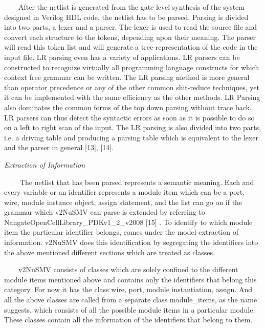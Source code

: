 \documentclass[a4paper]{article}
\begin{document}
{\color[rgb]{0.0,0.0,0.039215688}
\textrm{\ \ }\textrm{\ \ After the netlist is generated from the gate
level synthesis of the system designed in Verilog HDL code, the netlist
has to be parsed. Parsing is divided into two parts, a lexer and a
parser. The lexer is used to read the source file and convert each
structure to the tokens, depending upon their meaning. The parser will
read this token list and will generate a tree-representation of the
code in the input file. LR parsing even has a variety of applications.
LR parsers can be constructed to recognize virtually all programming
language constructs for which context free grammar can be written. The
LR parsing method is more general than operator precedence or any of
the other common shit-reduce techniques, yet it can be implemented with
the same efficiency as the other methods. LR Parsing also dominates the
common forms of the top down parsing without trace back. LR parsers can
thus detect the syntactic errors as soon as it is possible to do so on
a left to right scan of the input. The LR parsing is also divided into
two parts, i.e. a driving table and producing a parsing table which is
equivalent to the lexer and the parser in general [13], [14].\ }}

{\color[rgb]{0.0,0.0,0.039215688}
\textrm{\textit{Extraction of Information}}}

{\color[rgb]{0.0,0.0,0.039215688}
\textrm{\textit{\ \ }}\textrm{\textbf{\textit{\ \ }}}\textrm{The netlist
that has been parsed represents a semantic meaning. Each and every
variable or an identifier represents a module item which can be a port,
wire, module instance object, assign statement, and the list can go on
if the grammar which v2NuSMV can parse is extended by referring to
NangateOpenCellLibrary\_PDKv1\_2\_v2008 [15] . To identify to which
module item the particular identifier belongs, comes under the
model-extraction of information. v2NuSMV does this identification by
segregating the identifiers into the above mentioned different sections
which are treated as classes.\ }}

{\color[rgb]{0.0,0.0,0.039215688}
\textrm{\ \ }\textrm{\ \ v2NuSMV consists of classes which are solely
confined to the different module items mentioned above and contains
only the identifiers that belong this category. For now it has the
class wire, port, module instantiation, assign. And all the above
classes are called from a separate class module\_items, as the name
suggests, which consists of all the possible module items in a
particular module. These classes contain all the information of the
identifiers that belong to them.}}
\end{document}
